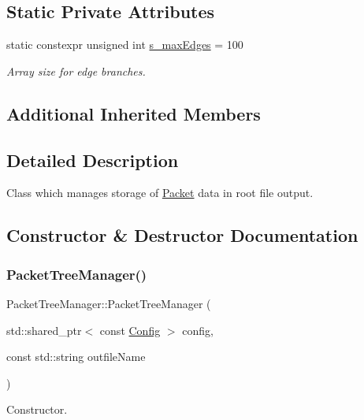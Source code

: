\subsection*{Static Private Attributes}
\begin{DoxyCompactItemize}
\item 
static constexpr unsigned int \hyperlink{class_packet_tree_manager_a4ba06517ad1cb912ff70df1ff69231a5}{s\+\_\+max\+Edges} = 100
\begin{DoxyCompactList}\small\item\em Array size for edge branches. \end{DoxyCompactList}\end{DoxyCompactItemize}
\subsection*{Additional Inherited Members}


\subsection{Detailed Description}
Class which manages storage of \hyperlink{class_packet}{Packet} data in root file output. 

\subsection{Constructor \& Destructor Documentation}
\mbox{\label{class_packet_tree_manager_ab5393bcd3be4255232d9750cf85a4b13}} 
\subsubsection{\texorpdfstring{Packet\+Tree\+Manager()}{PacketTreeManager()}}
{\footnotesize\ttfamily Packet\+Tree\+Manager\+::\+Packet\+Tree\+Manager (\begin{DoxyParamCaption}\item[{std\+::shared\+\_\+ptr$<$ const \hyperlink{class_config}{Config} $>$}]{config,  }\item[{const std\+::string}]{outfile\+Name }\end{DoxyParamCaption})}



Constructor. 


